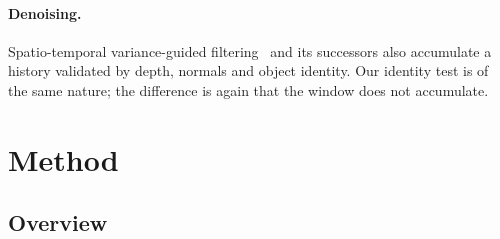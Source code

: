 \documentclass[11pt,a4paper]{article}
\begin{document}
\paragraph{Denoising.} Spatio-temporal variance-guided filtering~\cite{schied2017svgf} and its successors also accumulate a history validated by depth, normals and object identity. Our identity test is of the same nature; the difference is again that the window does not accumulate.

\section{Method}
\label{sec:method}

\subsection{Overview}
\label{sec:overview}
\end{document}
